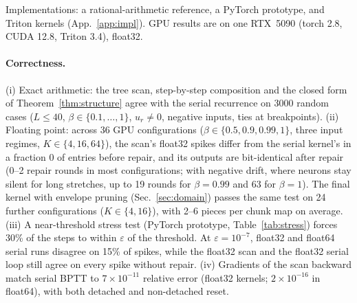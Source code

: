 \documentclass[10pt]{article}
\theoremstyle{remark}
\begin{document}
Implementations: a rational-arithmetic reference, a PyTorch prototype, and Triton kernels (App.~\ref{app:impl}). GPU results are on one RTX~5090 (torch 2.8, CUDA 12.8, Triton 3.4), float32.

\paragraph{Correctness.}
(i) Exact arithmetic: the tree scan, step-by-step composition and the closed form of Theorem~\ref{thm:structure} agree with the serial recurrence on 3000 random cases ($L\le40$, $\beta\in\{0.1,\ldots,1\}$, $u_r\neq0$, negative inputs, ties at breakpoints). (ii) Floating point: across 36 GPU configurations ($\beta\in\{0.5,0.9,0.99,1\}$, three input regimes, $K\in\{4,16,64\}$), the scan's float32 spikes differ from the serial kernel's in a fraction $0$ of entries before repair, and its outputs are bit-identical after repair (0--2 repair rounds in most configurations; with negative drift, where neurons stay silent for long stretches, up to 19 rounds for $\beta=0.99$ and 63 for $\beta=1$). The final kernel with envelope pruning (Sec.~\ref{sec:domain}) passes the same test on 24 further configurations ($K\in\{4,16\}$), with 2--6 pieces per chunk map on average. (iii) A near-threshold stress test (PyTorch prototype, Table~\ref{tab:stress}) forces 30\% of the steps to within $\varepsilon$ of the threshold. At $\varepsilon=10^{-7}$, float32 and float64 serial runs disagree on 15\% of spikes, while the float32 scan and the float32 serial loop still agree on every spike without repair. (iv) Gradients of the scan backward match serial BPTT to $7\times10^{-11}$ relative error (float32 kernels; $2\times10^{-16}$ in float64), with both detached and non-detached reset.
\end{document}
